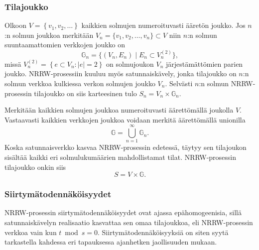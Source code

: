 \documentclass[finnish, 12pt, a4paper, sci, utf8, pdfa]{aaltothesis}
\begin{document}
\subsubsection{Tilajoukko}

Olkoon $ V = \left\{ v_{1}, v_{2}, \ldots \right\} $ kaikkien solmujen numeroituvasti ääretön joukko. Jos $ n $:n solmun joukkoa merkitään $ V_{n} = \{ v_{1}, v_{2}, \ldots , v_{n} \} \subset V $ niin $ n $:n solmun suuntaamattomien verkkojen joukko on
\[
   \mathbb{G}_{n} = \{ (V_{n}, E_{n}) \mid E_{n} \subset V_{n}^{(2)}  \},
\]
missä $ V_{n}^{(2)} = \left\{ e \subset V_{n} : |e| = 2 \right\} $ on solmujoukon $ V_{n} $ järjestämättömien parien joukko. NRRW-prosessiin kuuluu myös satunnaiskävely, jonka tilajoukko on $ n $:n solmun verkkoa kulkiessa verkon solmujen joukko $ V_{n} $. Selvästi $ n $:n solmun NRRW-prosessin tilajoukko on siis karteesinen tulo $ S_{n} = V_{n} \times \mathbb{G}_{n} $.

Merkitään kaikkien solmujen joukkoa numeroituvasti äärettömällä joukolla $ V $. Vastaavasti kaikkien verkkojen joukkoa voidaan merkitä äärettömällä unionilla
\begin{equation}
   \mathbb{G} = \bigcup_{n = 1}^{\infty} \mathbb{G}_{n}.
\end{equation}
Koska satunnaisverkko kasvaa NRRW-prosessin edetessä, täytyy sen tilajoukon sisältää kaikki eri solmulukumäärien mahdollistamat tilat. NRRW-prosessin tilajoukko onkin siis
\begin{equation}
   S = V \times \mathbb{G}.
   \label{equation:tilajoukko}
\end{equation}

\subsubsection{Siirtymätodennäköisyydet}

NRRW-prosessin siirtymätodennäköisyydet ovat ajassa epähomogeenisia, sillä satunnaiskävelyn realisaatio kasvattaa sen omaa tilajoukkoa, eli NRRW-prosessin verkkoa vain kun $ t \bmod s = 0 $. Siirtymätodennäköisyyksiä on siten syytä tarkastella kahdessa eri tapauksessa ajanhetken jaollisuuden mukaan. 
\end{document}

